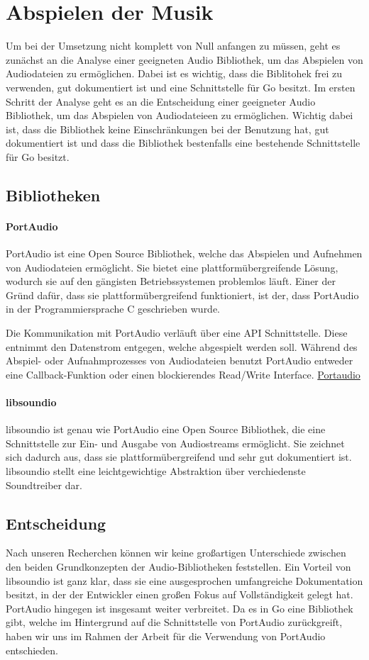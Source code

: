 \section{Abspielen der Musik}
Um bei der Umsetzung nicht komplett von Null anfangen zu müssen, geht es
zunächst an die Analyse einer geeigneten Audio Bibliothek, um das Abspielen von
Audiodateien zu ermöglichen. Dabei ist es wichtig, dass die Biblitohek frei zu
verwenden, gut dokumentiert ist und eine Schnittstelle für Go besitzt.  Im
ersten Schritt der Analyse geht es an die Entscheidung einer geeigneter Audio
Bibliothek, um das Abspielen von Audiodateieen zu ermöglichen. Wichtig dabei
ist, dass die Bibliothek keine Einschränkungen bei der Benutzung hat, gut
dokumentiert ist und dass die Bibliothek bestenfalls eine bestehende
Schnittstelle für Go besitzt.
\subsection{Bibliotheken}
\paragraph{PortAudio}
PortAudio ist eine Open Source Bibliothek, welche das Abspielen und Aufnehmen
von Audiodateien ermöglicht. Sie bietet eine plattformübergreifende Lösung,
wodurch sie auf den gängisten Betriebssystemen problemlos läuft. Einer der
Gründ dafür, dass sie plattformübergreifend funktioniert, ist der, dass
PortAudio in der Programmiersprache C geschrieben wurde. \hfill \break

Die Kommunikation mit PortAudio verläuft über eine \ac{API} Schnittstelle.
Diese entnimmt den Datenstrom entgegen, welche abgespielt werden soll. Während
des Abspiel- oder Aufnahmprozesses von Audiodateien benutzt PortAudio entweder
eine Callback-Funktion oder einen blockierendes Read/Write Interface.
\href{http://www.portaudio.com/}{Portaudio}

\paragraph{libsoundio}
libsoundio ist genau wie PortAudio eine Open Source Bibliothek, die eine
Schnittstelle zur Ein- und Ausgabe von Audiostreams ermöglicht. Sie zeichnet
sich dadurch aus, dass sie plattformübergreifend und sehr gut dokumentiert ist.
libsoundio stellt eine leichtgewichtige Abstraktion über verchiedenste
Soundtreiber dar.

\subsection{Entscheidung}
Nach unseren Recherchen können wir keine großartigen Unterschiede zwischen den
beiden Grundkonzepten der Audio-Bibliotheken feststellen. Ein Vorteil von
libsoundio ist ganz klar, dass sie eine ausgesprochen umfangreiche
Dokumentation besitzt, in der der Entwickler einen großen Fokus auf
Vollständigkeit gelegt hat. PortAudio hingegen ist insgesamt weiter verbreitet.
Da es in Go eine Bibliothek gibt, welche im Hintergrund auf die Schnittstelle
von PortAudio zurückgreift, haben wir uns im Rahmen der Arbeit für die
Verwendung von PortAudio entschieden.


